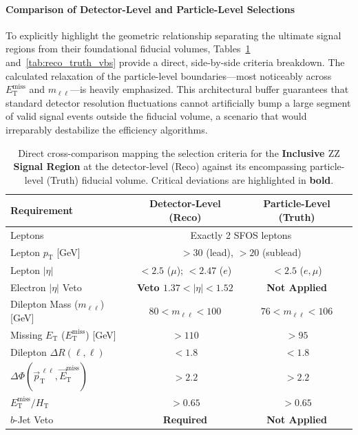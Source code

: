 \paragraph{\textbf{Comparison of Detector-Level and Particle-Level Selections}}
To explicitly highlight the geometric relationship separating the ultimate signal regions from their foundational fiducial volumes, Tables~\ref{tab:reco_truth_inclusive} and~\ref{tab:reco_truth_vbs} provide a direct, side-by-side criteria breakdown. The calculated relaxation of the particle-level boundaries—most noticeably across $E_{\text{T}}^{\text{miss}}$ and $m_{\ell\ell}$—is heavily emphasized. This architectural buffer guarantees that standard detector resolution fluctuations cannot artificially bump a large segment of valid signal events outside the fiducial volume, a scenario that would irreparably destabilize the efficiency algorithms.

\begin{table}[!htbp]
    \centering
    \renewcommand{\arraystretch}{1.3}
    \begin{tabular}{l|c|c}
        \hline \hline
        \textbf{Requirement} & \textbf{Detector-Level (Reco)} & \textbf{Particle-Level (Truth)} \\
        \hline
        Leptons & \multicolumn{2}{c}{Exactly 2 SFOS leptons} \\
        Lepton $p_{\text{T}}$ [GeV] & \multicolumn{2}{c}{$> 30$ (lead), $> 20$ (sublead)} \\
        Lepton $|\eta|$ & $< 2.5$ ($\mu$); $< 2.47$ ($e$) & $< 2.5$ ($e, \mu$) \\
        Electron $|\eta|$ Veto & \textbf{Veto $1.37 < |\eta| < 1.52$} & \textbf{Not Applied} \\
        Dilepton Mass ($m_{\ell\ell}$) [GeV] & $80 < m_{\ell\ell} < 100$ & \textbf{$76 < m_{\ell\ell} < 106$} \\
        \hline
        Missing $E_{\text{T}}$ ($E_{\text{T}}^{\text{miss}}$) [GeV] & $> 110$ & \textbf{$> 95$} \\
        Dilepton $\Delta R(\ell,\ell)$ & $< 1.8$ & $< 1.8$ \\
        $\Delta\Phi(\vec{p}_{\text{T}}^{\,\ell\ell}, \vec{E}_{\text{T}}^{\text{miss}})$ & $> 2.2$ & $> 2.2$ \\
        $E_{\text{T}}^{\text{miss}} / H_{\text{T}}$ & $> 0.65$ & $> 0.65$ \\
        \hline
        $b$-Jet Veto & \textbf{Required} & \textbf{Not Applied} \\
        \hline \hline
    \end{tabular}
    \caption{Direct cross-comparison mapping the selection criteria for the \textbf{Inclusive $\text{ZZ}$ Signal Region} at the detector-level (Reco) against its encompassing particle-level (Truth) fiducial volume. Critical deviations are highlighted in \textbf{bold}.}
    \label{tab:reco_truth_inclusive}    
\end{table}

